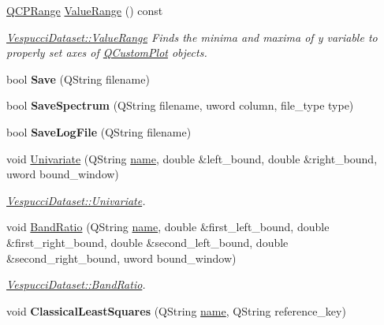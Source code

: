 \begin{DoxyCompactItemize}
\hyperlink{class_q_c_p_range}{Q\+C\+P\+Range} \hyperlink{class_vespucci_dataset_ae93323a39a9857f150f203d7e9a82536}{Value\+Range} () const 
\begin{DoxyCompactList}\small\item\em \hyperlink{class_vespucci_dataset_ae93323a39a9857f150f203d7e9a82536}{Vespucci\+Dataset\+::\+Value\+Range} Finds the minima and maxima of y variable to properly set axes of \hyperlink{class_q_custom_plot}{Q\+Custom\+Plot} objects. \end{DoxyCompactList}\item 
bool {\bfseries Save} (Q\+String filename)\hypertarget{class_vespucci_dataset_a7be76ea62f7f2119a0f3eeb0fbc92d02}{}\label{class_vespucci_dataset_a7be76ea62f7f2119a0f3eeb0fbc92d02}

\item 
bool {\bfseries Save\+Spectrum} (Q\+String filename, uword column, file\+\_\+type type)\hypertarget{class_vespucci_dataset_a47cdd14a8b190bf8b8bd2c1d9a466dc5}{}\label{class_vespucci_dataset_a47cdd14a8b190bf8b8bd2c1d9a466dc5}

\item 
bool {\bfseries Save\+Log\+File} (Q\+String filename)\hypertarget{class_vespucci_dataset_a7c17f6c518524a354d010862eb7fff6e}{}\label{class_vespucci_dataset_a7c17f6c518524a354d010862eb7fff6e}

\item 
void \hyperlink{class_vespucci_dataset_a50c1c23abc0c6d3bd33eee475df7e66a}{Univariate} (Q\+String \hyperlink{class_vespucci_dataset_a345a51b60127316b41caf92dc88fd792}{name}, double \&left\+\_\+bound, double \&right\+\_\+bound, uword bound\+\_\+window)
\begin{DoxyCompactList}\small\item\em \hyperlink{class_vespucci_dataset_a50c1c23abc0c6d3bd33eee475df7e66a}{Vespucci\+Dataset\+::\+Univariate}. \end{DoxyCompactList}\item 
void \hyperlink{class_vespucci_dataset_a6a86cccf31a552b515605debaf4de387}{Band\+Ratio} (Q\+String \hyperlink{class_vespucci_dataset_a345a51b60127316b41caf92dc88fd792}{name}, double \&first\+\_\+left\+\_\+bound, double \&first\+\_\+right\+\_\+bound, double \&second\+\_\+left\+\_\+bound, double \&second\+\_\+right\+\_\+bound, uword bound\+\_\+window)
\begin{DoxyCompactList}\small\item\em \hyperlink{class_vespucci_dataset_a6a86cccf31a552b515605debaf4de387}{Vespucci\+Dataset\+::\+Band\+Ratio}. \end{DoxyCompactList}\item 
void {\bfseries Classical\+Least\+Squares} (Q\+String \hyperlink{class_vespucci_dataset_a345a51b60127316b41caf92dc88fd792}{name}, Q\+String reference\+\_\+key)\hypertarget{class_vespucci_dataset_a4e2245789fdf471b38fd8fd9c6b02790}{}\label{class_vespucci_dataset_a4e2245789fdf471b38fd8fd9c6b02790}


\end{DoxyCompactItemize}
